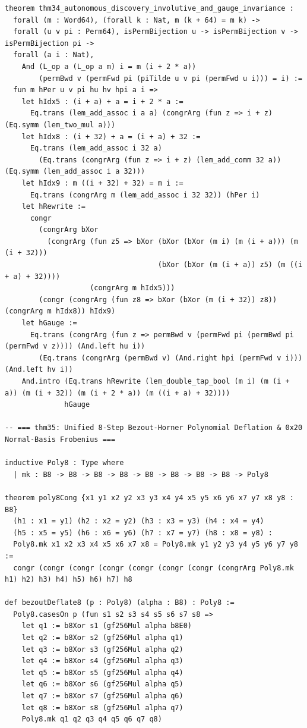 \documentclass[10pt,twocolumn]{article}
\theoremstyle{spectralthm}
\begin{document}
\begin{lstlisting}[language=Lean4,caption={Standalone Pure Init.Prelude Term-Mode Lean 4 Expansion (thm30--thm37, v1.1.0, 0 sorry, 0 axioms).},label={lst:lean_v110}]
theorem thm34_autonomous_discovery_involutive_and_gauge_invariance :
  forall (m : Word64), (forall k : Nat, m (k + 64) = m k) ->
  forall (u v pi : Perm64), isPermBijection u -> isPermBijection v -> isPermBijection pi ->
  forall (a i : Nat),
    And (L_op a (L_op a m) i = m (i + 2 * a))
        (permBwd v (permFwd pi (piTilde u v pi (permFwd u i))) = i) :=
  fun m hPer u v pi hu hv hpi a i =>
    let hIdx5 : (i + a) + a = i + 2 * a :=
      Eq.trans (lem_add_assoc i a a) (congrArg (fun z => i + z) (Eq.symm (lem_two_mul a)))
    let hIdx8 : (i + 32) + a = (i + a) + 32 :=
      Eq.trans (lem_add_assoc i 32 a)
        (Eq.trans (congrArg (fun z => i + z) (lem_add_comm 32 a)) (Eq.symm (lem_add_assoc i a 32)))
    let hIdx9 : m ((i + 32) + 32) = m i :=
      Eq.trans (congrArg m (lem_add_assoc i 32 32)) (hPer i)
    let hRewrite :=
      congr
        (congrArg bXor
          (congrArg (fun z5 => bXor (bXor (bXor (m i) (m (i + a))) (m (i + 32)))
                                    (bXor (bXor (m (i + a)) z5) (m ((i + a) + 32))))
                    (congrArg m hIdx5)))
        (congr (congrArg (fun z8 => bXor (bXor (m (i + 32)) z8)) (congrArg m hIdx8)) hIdx9)
    let hGauge :=
      Eq.trans (congrArg (fun z => permBwd v (permFwd pi (permBwd pi (permFwd v z)))) (And.left hu i))
        (Eq.trans (congrArg (permBwd v) (And.right hpi (permFwd v i))) (And.left hv i))
    And.intro (Eq.trans hRewrite (lem_double_tap_bool (m i) (m (i + a)) (m (i + 32)) (m (i + 2 * a)) (m ((i + a) + 32))))
              hGauge

-- === thm35: Unified 8-Step Bezout-Horner Polynomial Deflation & 0x20 Normal-Basis Frobenius ===

inductive Poly8 : Type where
  | mk : B8 -> B8 -> B8 -> B8 -> B8 -> B8 -> B8 -> B8 -> Poly8

theorem poly8Cong {x1 y1 x2 y2 x3 y3 x4 y4 x5 y5 x6 y6 x7 y7 x8 y8 : B8}
  (h1 : x1 = y1) (h2 : x2 = y2) (h3 : x3 = y3) (h4 : x4 = y4)
  (h5 : x5 = y5) (h6 : x6 = y6) (h7 : x7 = y7) (h8 : x8 = y8) :
  Poly8.mk x1 x2 x3 x4 x5 x6 x7 x8 = Poly8.mk y1 y2 y3 y4 y5 y6 y7 y8 :=
  congr (congr (congr (congr (congr (congr (congr (congrArg Poly8.mk h1) h2) h3) h4) h5) h6) h7) h8

def bezoutDeflate8 (p : Poly8) (alpha : B8) : Poly8 :=
  Poly8.casesOn p (fun s1 s2 s3 s4 s5 s6 s7 s8 =>
    let q1 := b8Xor s1 (gf256Mul alpha b8E0)
    let q2 := b8Xor s2 (gf256Mul alpha q1)
    let q3 := b8Xor s3 (gf256Mul alpha q2)
    let q4 := b8Xor s4 (gf256Mul alpha q3)
    let q5 := b8Xor s5 (gf256Mul alpha q4)
    let q6 := b8Xor s6 (gf256Mul alpha q5)
    let q7 := b8Xor s7 (gf256Mul alpha q6)
    let q8 := b8Xor s8 (gf256Mul alpha q7)
    Poly8.mk q1 q2 q3 q4 q5 q6 q7 q8)


\end{lstlisting}
\end{document}
